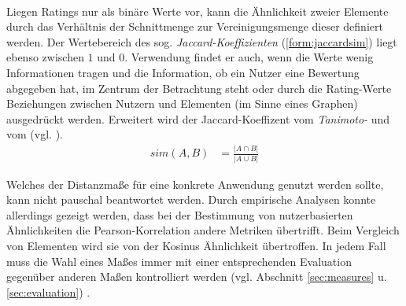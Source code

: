\paragraph{} Liegen Ratings nur als binäre Werte vor, kann die Ähnlichkeit zweier Elemente durch das Verhältnis der Schnittmenge zur Vereinigungsmenge dieser definiert werden. Der Wertebereich des sog. \textit{Jaccard-Koeffizienten} (\ref{form:jaccardsim}) liegt ebenso zwischen $1$ und $0$. Verwendung findet er auch, wenn die Werte wenig Informationen tragen und die Information, ob ein Nutzer eine Bewertung abgegeben hat, im Zentrum der Betrachtung steht oder durch die Rating-Werte Beziehungen zwischen Nutzern und Elementen (im Sinne eines Graphen) ausgedrückt werden. Erweitert wird der Jaccard-Koeffizent vom \textit{Tanimoto-} und vom \textit{} (vgl. \citep{bogers09}). \citep[Kap. 3.1]{rs} \citep{pci}
\begin{align}
\label{form:jaccardsim}
sim(A,B) & = \frac{|A \cap B|}{|A \cup B|}
\end{align}

Welches der Distanzmaße für eine konkrete Anwendung genutzt werden sollte, kann nicht pauschal beantwortet werden. Durch empirische Analysen konnte allerdings gezeigt werden, dass bei der Bestimmung von nutzerbasierten Ähnlichkeiten die Pearson-Korrelation andere Metriken übertrifft. Beim Vergleich von Elementen wird sie von der Kosinus Ähnlichkeit übertroffen. In jedem Fall muss die Wahl eines Maßes immer mit einer entsprechenden Evaluation gegenüber anderen Maßen kontrolliert werden (vgl. Abschnitt \ref{sec:measures} u. \ref{sec:evaluation}) \citep[Kap. 2.1.2]{rs} \citep{Cacheda2011}.
